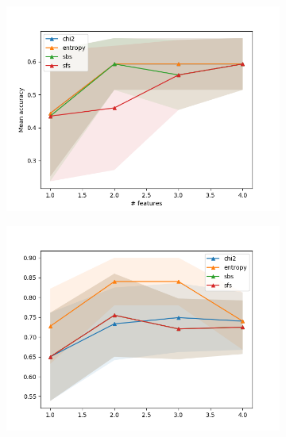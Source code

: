 \begin{figure}[htbp]
  \centering
  \begin{subfigure}[b]{0.475\textwidth}
      \centering
      \includegraphics[width=\textwidth]{../plots_with_std_fill/SVMd1.png}
      \caption[]%
      {{\small}}
      \label{fig:SVM_MIAS}
  \end{subfigure}
  \hfill
  \begin{subfigure}[b]{0.475\textwidth}
      \centering
      \includegraphics[width=\textwidth]{../plots_with_std_fill/SVMd2.png}
      \caption[]%
      {{\small}}
      \label{fig:SVM_EN}
  \end{subfigure}


\end{figure}
